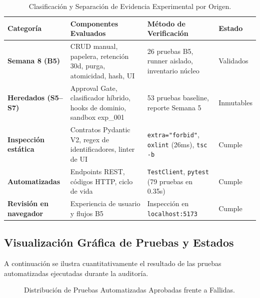 \documentclass[11pt,a4paper]{article}
\begin{document}
\begin{table}[H]
\centering
\small
\begin{tabularx}{\textwidth}{lp{5.0cm}p{4.2cm}l}
\toprule
\textbf{Categoría} & \textbf{Componentes Evaluados} & \textbf{Método de Verificación} & \textbf{Estado} \\
\midrule
\textbf{Semana 8 (B5)} & CRUD manual, papelera, retención 30d, purga, atomicidad, hash, UI & 26 pruebas B5, runner aislado, inventario núcleo & Validados \\
\textbf{Heredados (S5--S7)} & Approval Gate, clasificador híbrido, hooks de dominio, sandbox exp\_001 & 53 pruebas baseline, reporte Semana 5 & Inmutables \\
\textbf{Inspección estática} & Contratos Pydantic V2, regex de identificadores, linter de UI & \texttt{extra="forbid"}, \texttt{oxlint} (26ms), \texttt{tsc -b} & Cumple \\
\textbf{Automatizadas} & Endpoints REST, códigos HTTP, ciclo de vida & \texttt{TestClient}, \texttt{pytest} (79 pruebas en 0.35s) & Cumple \\
\textbf{Revisión en navegador} & Experiencia de usuario y flujos B5 & Inspección en \texttt{localhost:5173} & Cumple \\
\bottomrule
\end{tabularx}
\caption{Clasificación y Separación de Evidencia Experimental por Origen.}
\label{tab:origen_evidencia}
\end{table}

\subsection{Visualización Gráfica de Pruebas y Estados}
A continuación se ilustra cuantitativamente el resultado de las pruebas automatizadas ejecutadas durante la auditoría.

\begin{figure}[H]
\centering
{}
\caption{Distribución de Pruebas Automatizadas Aprobadas frente a Fallidas.}
\label{fig:chart_tests}
\end{figure}
\end{document}
